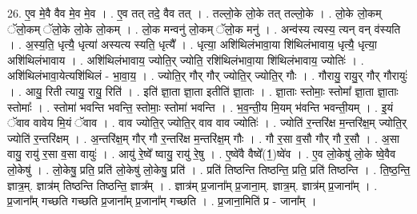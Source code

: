 \documentclass[17pt]{extarticle}
\begin{document}
26. ए॒व मे॒वै वैव मे॒व मे॒व । . ए॒व तत् तदे॒ वैव तत् । . तल्लो॒के लो॒के तत् तल्लो॒के । . लो॒के लो॒कम् ॅलो॒कम् ॅलो॒के लो॒के लो॒कम् । . लो॒क मन्वनु॑ लो॒कम् ॅलो॒क मनु॑ । . अन्व॑स्य त्यस्य॒ त्यन् वन् व॑स्यति । . अ॒स्य॒ति॒ धृत्यै॒ धृत्या॑ अस्यत्य स्यति॒ धृत्यै᳚ । . धृत्या॒ अशि॑थिलंभावा॒या शि॑थिलंभावाय॒ धृत्यै॒ धृत्या॒ अशि॑थिलंभावाय । . अशि॑थिलंभावाय॒ ज्योति॒र् ज्योति॒ रशि॑थिलंभावा॒या शि॑थिलंभावाय॒ ज्योतिः॑ । . अशि॑थिलंभावा॒येत्यशि॑थिलं - भा॒वा॒य॒ । . ज्योति॒र् गौर् गौर् ज्योति॒र् ज्योति॒र् गौः । . गौरायु॒ रायु॒र् गौर् गौरायुः॑ । . आयु॒ रिती त्यायु॒ रायु॒ रिति॑ । . इति॑ ज्ञा॒ता ज्ञा॒ता इतीति॑ ज्ञा॒ताः । . ज्ञा॒ताः स्तोमाः॒ स्तोमा᳚ ज्ञा॒ता ज्ञा॒ताः स्तोमाः᳚ । . स्तोमा॑ भवन्ति भवन्ति॒ स्तोमाः॒ स्तोमा॑ भवन्ति । . भ॒व॒न्ती॒य मि॒यम् भ॑वन्ति भवन्ती॒यम् । . इ॒यं ॅवाव वावेय मि॒यं ॅवाव । . वाव ज्योति॒र् ज्योति॒र् वाव वाव ज्योतिः॑ । . ज्योति॑ र॒न्तरि॑क्ष म॒न्तरि॑क्ष॒म् ज्योति॒र् ज्योति॑ र॒न्तरि॑क्षम् । . अ॒न्तरि॑क्ष॒म् गौर् गौ र॒न्तरि॑क्ष म॒न्तरि॑क्ष॒म् गौः । . गौ र॒सा व॒सौ गौर् गौ र॒सौ । . अ॒सा वायु॒ रायु॑ र॒सा व॒सा वायुः॑ । . आयु॑ रे॒ष्वे᳚ ष्वायु॒ रायु॑ रे॒षु । . ए॒ष्वे॑वै वैष्वे᳚(1॒)ष्वे॑व । . ए॒व लो॒केषु॑ लो॒के ष्वे॒वैव लो॒केषु॑ । . लो॒केषु॒ प्रति॒ प्रति॑ लो॒केषु॑ लो॒केषु॒ प्रति॑ । . प्रति॑ तिष्ठन्ति तिष्ठन्ति॒ प्रति॒ प्रति॑ तिष्ठन्ति । . ति॒ष्ठ॒न्ति॒ ज्ञात्र॒म्. ज्ञात्र॑म् तिष्ठन्ति तिष्ठन्ति॒ ज्ञात्र᳚म् । . ज्ञात्र॑म् प्र॒जाना᳚म् प्र॒जाना॒म्. ज्ञात्र॒म्. ज्ञात्र॑म् प्र॒जाना᳚म् । . प्र॒जाना᳚म् गच्छति गच्छति प्र॒जाना᳚म् प्र॒जाना᳚म् गच्छति । . प्र॒जाना॒मिति॑ प्र - जाना᳚म् । \newline
\end{document}
